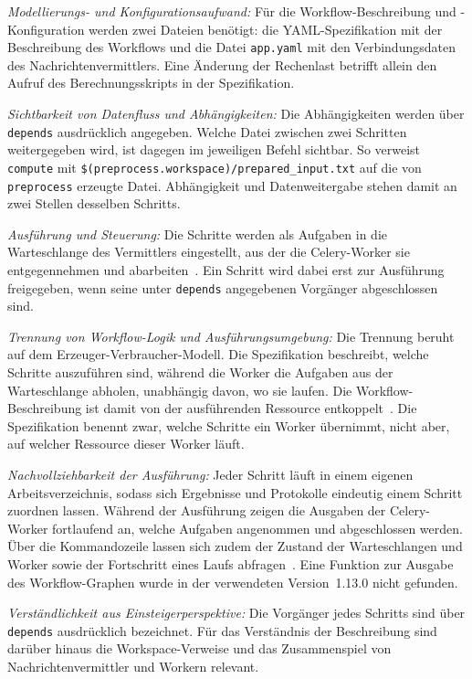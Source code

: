 \emph{Modellierungs- und Konfigurationsaufwand:} Für die
Workflow-Beschreibung und -Konfiguration werden zwei Dateien
benötigt: die YAML-Spezifikation mit der Beschreibung des Workflows
und die Datei \texttt{app.yaml} mit den Verbindungsdaten des
Nachrichtenvermittlers. Eine Änderung der Rechenlast betrifft allein
den Aufruf des Berechnungsskripts in der Spezifikation.

\emph{Sichtbarkeit von Datenfluss und Abhängigkeiten:} Die
Abhängigkeiten werden über \texttt{depends} ausdrücklich angegeben.
Welche Datei zwischen zwei Schritten weitergegeben wird, ist dagegen
im jeweiligen Befehl sichtbar. So verweist \texttt{compute} mit
\texttt{\$(preprocess.workspace)/prepared\_input.txt} auf die von
\texttt{preprocess} erzeugte Datei. Abhängigkeit und Datenweitergabe
stehen damit an zwei Stellen desselben Schritts.

\emph{Ausführung und Steuerung:} Die Schritte werden als Aufgaben in
die Warteschlange des Vermittlers eingestellt, aus der die
Celery-Worker sie entgegennehmen und
abarbeiten~\cite[S.~258]{peterson2022merlin}\cite{merlindocs-celery}.
Ein Schritt wird dabei erst zur Ausführung freigegeben, wenn seine
unter \texttt{depends} angegebenen Vorgänger abgeschlossen sind.

\emph{Trennung von Workflow-Logik und Ausführungsumgebung:} Die
Trennung beruht auf dem Erzeuger-Verbraucher-Modell. Die
Spezifikation beschreibt, welche Schritte auszuführen sind, während
die Worker die Aufgaben aus der Warteschlange abholen, unabhängig
davon, wo sie laufen. Die Workflow-Beschreibung ist damit von der
ausführenden Ressource entkoppelt~\cite[S.~261]{peterson2022merlin}. Die
Spezifikation benennt zwar, welche Schritte ein Worker übernimmt,
nicht aber, auf welcher Ressource dieser Worker läuft.


\emph{Nachvollziehbarkeit der Ausführung:} Jeder Schritt läuft in
einem eigenen Arbeitsverzeichnis, sodass sich Ergebnisse und
Protokolle eindeutig einem Schritt zuordnen lassen. Während der
Ausführung zeigen die Ausgaben der Celery-Worker fortlaufend an,
welche Aufgaben angenommen und abgeschlossen werden. Über die
Kommandozeile lassen sich zudem der Zustand der Warteschlangen und
Worker sowie der Fortschritt eines Laufs abfragen~\cite{merlindocs-commands}.
Eine Funktion zur Ausgabe des Workflow-Graphen wurde in der
verwendeten Version~1.13.0 nicht gefunden.

\emph{Verständlichkeit aus Einsteigerperspektive:} Die Vorgänger
jedes Schritts sind über \texttt{depends} ausdrücklich bezeichnet.
Für das Verständnis der Beschreibung sind darüber hinaus die
Workspace-Verweise und das Zusammenspiel von Nachrichtenvermittler
und Workern relevant.

